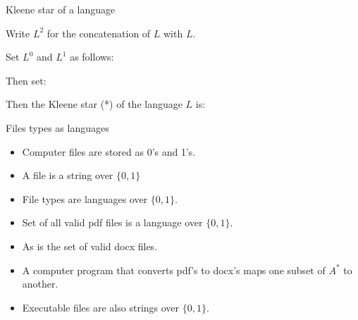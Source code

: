 \begin{frame}{Kleene star of a language}


  \vspace{2mm}

  Write $L^2$ for the concatenation of $L$ with $L$.


  \vspace{2mm}

  Set $L^0$ and $L^1$ as follows:


  \vspace{2mm}

  Then set:


  \vspace{2mm}

  Then the Kleene star (*) of the language $L$ is:


\end{frame}


\begin{frame}{Files types as languages}
  \begin{itemize}
    \setlength\itemsep{3mm}
    \item Computer files are stored as 0's and 1's.
    \item A file is a string over $\{ 0, 1 \}$
    \item File types are languages over $\{ 0, 1 \}$.
    \item Set of all valid pdf files is a language over $\{ 0,1 \}$.
    \item As is the set of valid docx files.
    \item A computer program that converts pdf's to docx's maps one subset of $A^*$ to another.
    \item Executable files are also strings over $\{ 0, 1 \}$.
  \end{itemize}
\end{frame}